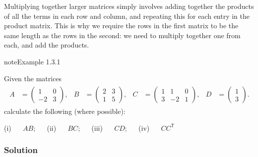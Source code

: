 \documentclass[letterpaper,10pt,english]{jupyterBook}
\begin{document}
\sphinxAtStartPar
Multiplying together larger matrices simply involves adding together the products of all the terms in each row and column, and repeating this for each entry in the product matrix. This is why we require the rows in the first matrix to be the same length as the rows in the second: we need to multiply together one from each, and add the products.
\label{_pages/1.2_Matrix_multiplication:matrix-multiplication-example}
\begin{sphinxadmonition}{note}{Example 1.3.1}



\sphinxAtStartPar
Given the matrices
\begin{equation*}
\begin{split} \begin{align*}
    A &= \begin{pmatrix} 1 & 0 \\ -2 & 3 \end{pmatrix}, &
    B &= \begin{pmatrix} 2 & 3 \\ 1 & 5 \end{pmatrix}, &
    C &= \begin{pmatrix} 1 & 1 & 0 \\ 3 & -2 & 1 \end{pmatrix}, &
    D &= \begin{pmatrix} 1 \\ 3 \end{pmatrix}.
\end{align*} \end{split}
\end{equation*}
\sphinxAtStartPar
calculate the following (where possible):

\sphinxAtStartPar
(i)   \(AB\);  
(ii)   \(BC\);  
(iii)   \(CD\);  
(iv)   \(CC^\mathsf{T}\)
\subsubsection*{Solution}


\end{sphinxadmonition}
\end{document}
